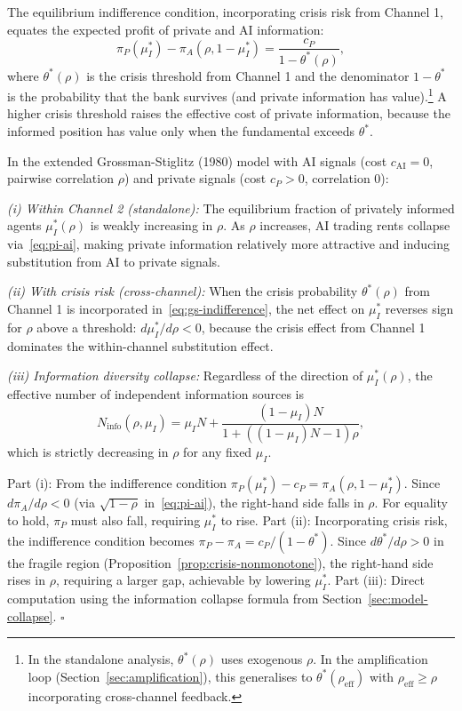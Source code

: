 The equilibrium indifference condition, incorporating crisis risk from Channel 1, equates the expected profit of private and AI information:
\begin{equation}\label{eq:gs-indifference}
  \pi_P(\mu_I^*) - \pi_A(\rho, 1-\mu_I^*) = \frac{c_P}{1 - \theta^*(\rho)},
\end{equation}
where $\theta^*(\rho)$ is the crisis threshold from Channel 1 and the denominator $1 - \theta^*$ is the probability that the bank survives (and private information has value).\footnote{In the standalone analysis, $\theta^*(\rho)$ uses exogenous $\rho$. In the amplification loop (Section~\ref{sec:amplification}), this generalises to $\theta^*(\rho_{\text{eff}})$ with $\rho_{\text{eff}} \geq \rho$ incorporating cross-channel feedback.} A higher crisis threshold raises the effective cost of private information, because the informed position has value only when the fundamental exceeds $\theta^*$.

\begin{proposition}\label{prop:info-diversity}
  In the extended Grossman-Stiglitz (1980) model with AI signals (cost $c_{\text{AI}} = 0$, pairwise correlation $\rho$) and private signals (cost $c_P > 0$, correlation 0):

  \emph{(i) Within Channel 2 (standalone):} The equilibrium fraction of privately informed agents $\mu_I^*(\rho)$ is weakly increasing in $\rho$. As $\rho$ increases, AI trading rents collapse via~\eqref{eq:pi-ai}, making private information relatively more attractive and inducing substitution from AI to private signals.

  \emph{(ii) With crisis risk (cross-channel):} When the crisis probability $\theta^*(\rho)$ from Channel 1 is incorporated in~\eqref{eq:gs-indifference}, the net effect on $\mu_I^*$ reverses sign for $\rho$ above a threshold: $d\mu_I^*/d\rho < 0$, because the crisis effect from Channel 1 dominates the within-channel substitution effect.

  \emph{(iii) Information diversity collapse:} Regardless of the direction of $\mu_I^*(\rho)$, the effective number of independent information sources is
  \begin{equation}\label{eq:ninfo-full}
    N_{\text{info}}(\rho, \mu_I) = \mu_I N + \frac{(1-\mu_I) N}{1 + ((1-\mu_I)N-1)\rho},
  \end{equation}
  which is strictly decreasing in $\rho$ for any fixed $\mu_I$.

   Part (i): From the indifference condition $\pi_P(\mu_I^*) - c_P = \pi_A(\rho, 1-\mu_I^*)$. Since $d\pi_A/d\rho < 0$ (via $\sqrt{1-\rho}$ in~\eqref{eq:pi-ai}), the right-hand side falls in $\rho$. For equality to hold, $\pi_P$ must also fall, requiring $\mu_I^*$ to rise. Part (ii): Incorporating crisis risk, the indifference condition becomes $\pi_P - \pi_A = c_P/(1-\theta^*)$. Since $d\theta^*/d\rho > 0$ in the fragile region (Proposition~\ref{prop:crisis-nonmonotone}), the right-hand side rises in $\rho$, requiring a larger gap, achievable by lowering $\mu_I^*$. Part (iii): Direct computation using the information collapse formula from Section~\ref{sec:model-collapse}. $\square$
\end{proposition}

